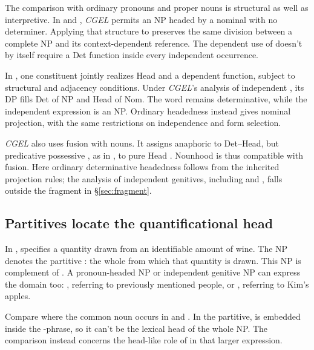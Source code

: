 \documentclass[12pt]{article}
\begin{document}
The comparison with ordinary pronouns and proper nouns is structural as well as interpretive. In  and , \textit{CGEL} permits an NP headed by a nominal with no determiner. Applying that structure to  preserves the same division between a complete NP and its context-dependent reference. The dependent use of  doesn't by itself require a Det function inside every independent occurrence.

In \textcite{Payne2007}, one constituent jointly realizes Head and a dependent function, subject to structural and adjacency conditions. Under \textit{CGEL}'s analysis of independent , its DP fills Det of NP and Head of Nom. The word remains determinative, while the independent expression is an NP. Ordinary headedness instead gives  nominal projection, with the same restrictions on independence and form selection.

\textit{CGEL} also uses fusion with nouns. It assigns anaphoric  to Det--Head, but predicative possessive , as in , to pure Head \citep[410--411]{huddleston2002}. Nounhood is thus compatible with fusion. Here ordinary determinative headedness follows from the inherited projection rules; the analysis of independent genitives, including  and , falls outside the fragment in §\ref{sec:fragment}.

\subsection{Partitives locate the quantificational head}

In ,  specifies a quantity drawn from an identifiable amount of wine. The NP  denotes the partitive : the whole from which that quantity is drawn. This NP is complement of . A pronoun-headed NP or independent genitive NP can express the domain too: , referring to previously mentioned people, or , referring to Kim's apples.

Compare where the common noun occurs in  and . In the partitive,  is embedded inside the -phrase, so it can't be the lexical head of the whole NP. The comparison instead concerns the head-like role of  in that larger expression.
\end{document}
